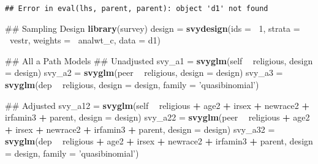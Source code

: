 \documentclass[]{article}
\newenvironment{Shaded}{\begin{snugshade}}{\end{snugshade}}
\newcommand{\KeywordTok}[1]{\textcolor[rgb]{0.13,0.29,0.53}{\textbf{#1}}}
\newcommand{\DataTypeTok}[1]{\textcolor[rgb]{0.13,0.29,0.53}{#1}}
\newcommand{\DecValTok}[1]{\textcolor[rgb]{0.00,0.00,0.81}{#1}}
\newcommand{\StringTok}[1]{\textcolor[rgb]{0.31,0.60,0.02}{#1}}
\newcommand{\OperatorTok}[1]{\textcolor[rgb]{0.81,0.36,0.00}{\textbf{#1}}}
\newcommand{\NormalTok}[1]{#1}
\begin{document}
\begin{verbatim}
## Error in eval(lhs, parent, parent): object 'd1' not found
\end{verbatim}

\begin{Shaded}
\begin{Highlighting}[]
\NormalTok{## Sampling Design}
\KeywordTok{library}\NormalTok{(survey)}
\NormalTok{design =}\StringTok{ }\KeywordTok{svydesign}\NormalTok{(}\DataTypeTok{ids =} \OperatorTok{~}\DecValTok{1}\NormalTok{, }
                   \DataTypeTok{strata =} \OperatorTok{~}\NormalTok{vestr, }
                   \DataTypeTok{weights =} \OperatorTok{~}\NormalTok{analwt_c,}
                   \DataTypeTok{data =}\NormalTok{ d1)}

\NormalTok{## All a Path Models}
\NormalTok{## Unadjusted}
\NormalTok{svy_a1 =}\StringTok{ }\KeywordTok{svyglm}\NormalTok{(self }\OperatorTok{~}\StringTok{ }\NormalTok{religious, }\DataTypeTok{design =}\NormalTok{ design)}
\NormalTok{svy_a2 =}\StringTok{ }\KeywordTok{svyglm}\NormalTok{(peer }\OperatorTok{~}\StringTok{ }\NormalTok{religious, }\DataTypeTok{design =}\NormalTok{ design)}
\NormalTok{svy_a3 =}\StringTok{ }\KeywordTok{svyglm}\NormalTok{(dep }\OperatorTok{~}\StringTok{ }\NormalTok{religious, }\DataTypeTok{design =}\NormalTok{ design, }
                \DataTypeTok{family =} \StringTok{'quasibinomial'}\NormalTok{)}

\NormalTok{## Adjusted}
\NormalTok{svy_a12 =}\StringTok{ }\KeywordTok{svyglm}\NormalTok{(self }\OperatorTok{~}\StringTok{ }\NormalTok{religious }\OperatorTok{+}\StringTok{ }\NormalTok{age2 }\OperatorTok{+}\StringTok{ }
\StringTok{                   }\NormalTok{irsex }\OperatorTok{+}\StringTok{ }\NormalTok{newrace2 }\OperatorTok{+}\StringTok{ }\NormalTok{irfamin3 }\OperatorTok{+}\StringTok{ }\NormalTok{parent, }
                 \DataTypeTok{design =}\NormalTok{ design)}
\NormalTok{svy_a22 =}\StringTok{ }\KeywordTok{svyglm}\NormalTok{(peer }\OperatorTok{~}\StringTok{ }\NormalTok{religious }\OperatorTok{+}\StringTok{ }\NormalTok{age2 }\OperatorTok{+}\StringTok{ }
\StringTok{                   }\NormalTok{irsex }\OperatorTok{+}\StringTok{ }\NormalTok{newrace2 }\OperatorTok{+}\StringTok{ }\NormalTok{irfamin3 }\OperatorTok{+}\StringTok{ }\NormalTok{parent, }
                 \DataTypeTok{design =}\NormalTok{ design)}
\NormalTok{svy_a32 =}\StringTok{ }\KeywordTok{svyglm}\NormalTok{(dep }\OperatorTok{~}\StringTok{ }\NormalTok{religious }\OperatorTok{+}\StringTok{ }\NormalTok{age2 }\OperatorTok{+}\StringTok{ }
\StringTok{                   }\NormalTok{irsex }\OperatorTok{+}\StringTok{ }\NormalTok{newrace2 }\OperatorTok{+}\StringTok{ }\NormalTok{irfamin3 }\OperatorTok{+}\StringTok{ }\NormalTok{parent, }
                 \DataTypeTok{design =}\NormalTok{ design, }
                 \DataTypeTok{family =} \StringTok{'quasibinomial'}\NormalTok{)}


\end{Highlighting}
\end{Shaded}
\end{document}
